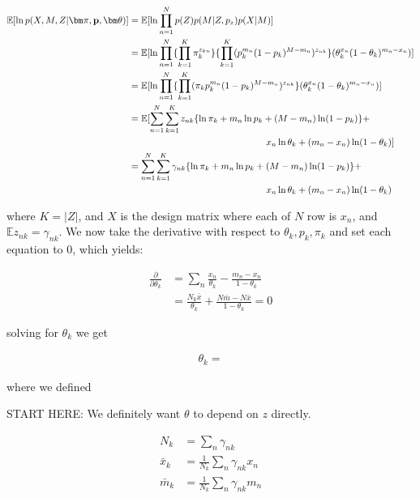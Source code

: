 \documentclass[a4paper]{article}
\newcommand{\vp}{{\bf p}}
\newcommand{\vpi}{{\bm \pi}}
\newcommand{\vtheta}{{\bm \theta}}
\newcommand{\E}{\mathbb{E}}
\begin{document}
\begin{align}
\E [ \ln p(X, M , Z | \vpi, \vp, \vtheta) ] &= \E [ \ln \prod_{n = 1}^{N}  p(Z) p(M | Z, p_{z} ) p(X | M ) ] \\
							&= \E [ \ln \prod_{n = 1}^{N} \{ \prod_{k = 1}^{K} \pi_k^{z_{kn}} \} \{ \prod_{k = 1}^{K} ( p_k^{m_n} (1-p_k)^{M - m_n} ) ^{z_{nk}} \} ( \theta_k^{x_n} (1 - \theta_k)^{m_n - x_n} ) ] \notag \\
							&= \E [ \ln \prod_{n = 1}^{N} \{ \prod_{k = 1}^{K} ( \pi_k  p_{k}^{m_n} (1-p_k)^{M - m_n} ) ^{z_{nk}} \} ( \theta_k^{x_n} (1 - \theta_k)^{m_n - x_n} ) ] \\
							&= \E [ \sum_{n = 1}^{N} \sum_{k = 1}^{K} z_{nk} \{ \ln \pi_k  + m_n \ln p_k + (M - m_n) \ln (1-p_k) \} + \notag \\
							&\phantom{---------------} x_n \ln \theta_k + (m_n - x_n) \ln (1 - \theta_k) ] \\
							&= \sum_{n = 1}^{N} \sum_{k = 1}^{K} \gamma_{nk} \{ \ln \pi_k  + m_n \ln p_k + (M - m_n) \ln (1-p_k) \} + \notag \\
							&\phantom{---------------} x_n \ln \theta_k + (m_n - x_n) \ln (1 - \theta_k)
\end{align} 

where $K = |Z|$, and $X$ is the design matrix where each of $N$ row is $x_n$, and $\E z_{nk} = \gamma_{nk}$. We now take the derivative with respect to $\theta_k, p_k, \pi_k$ and set each equation to 0, which yields:

\begin{align}
\frac{\partial}{\partial \theta_k} &= \sum_n \frac{x_n}{\theta_k} - \frac{m_n - x_n}{1- \theta_k} \\
					      &= \frac{N_k \bar{x}}{\theta_k} + \frac{N \bar{m} - N \bar{x}}{1- \theta_k} = 0
\end{align}

solving for $\theta_k$ we get

\begin{align}
\theta_k = 
\end{align}

where we defined

START HERE: We definitely want $\theta$ to depend on $z$ directly.

\begin{align}
N_k      &= \sum_n \gamma_{nk} \\
\bar{x}_k  &= \frac{1}{N_k} \sum_n \gamma_{nk} x_n \\
\bar{m}_k &= \frac{1}{N_k} \sum_n \gamma_{nk} m_n 
\end{align}
\end{document}
